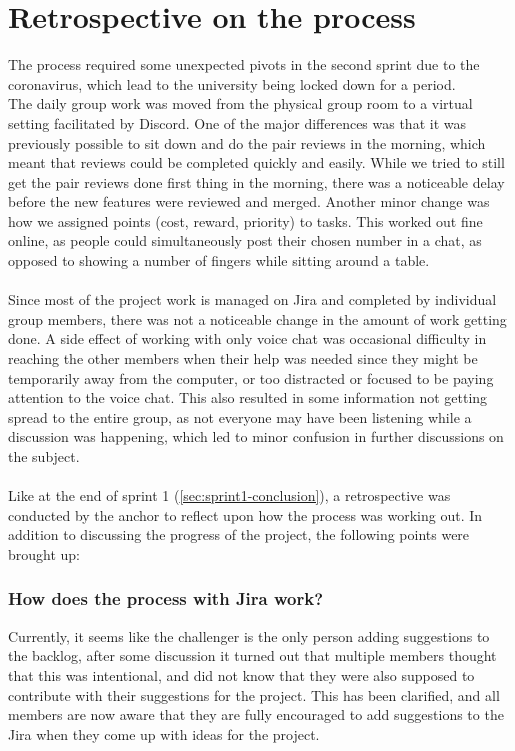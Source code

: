 \section{Retrospective on the process}
The process required some unexpected pivots in the second sprint due to the coronavirus, which lead to the university being locked down for a period.
\\
The daily group work was moved from the physical group room to a virtual setting facilitated by Discord.
One of the major differences was that it was previously possible to sit down and do the pair reviews in the morning, which meant that reviews could be completed quickly and easily.
While we tried to still get the pair reviews done first thing in the morning, there was a noticeable delay before the new features were reviewed and merged.
Another minor change was how we assigned points (cost, reward, priority) to tasks. This worked out fine online, as people could simultaneously post their chosen number in a chat, as opposed to showing a number of fingers while sitting around a table.
\\\\
Since most of the project work is managed on Jira and completed by individual group members, there was not a noticeable change in the amount of work getting done.
A side effect of working with only voice chat was occasional difficulty in reaching the other members when their help was needed since they might be temporarily away from the computer, or too distracted or focused to be paying attention to the voice chat.
This also resulted in some information not getting spread to the entire group, as not everyone may have been listening while a discussion was happening, which led to minor confusion in further discussions on the subject.\\\\

Like at the end of sprint 1 (\autoref{sec:sprint1-conclusion}), a retrospective was conducted by the anchor to reflect upon how the process was working out.
In addition to discussing the progress of the project, the following points were brought up:

\subsubsection{How does the process with Jira work?}
Currently, it seems like the challenger is the only person adding suggestions to the backlog, after some discussion it turned out that multiple members thought that this was intentional, and did not know that they were also supposed to contribute with their suggestions for the project.
This has been clarified, and all members are now aware that they are fully encouraged to add suggestions to the Jira when they come up with ideas for the project.

